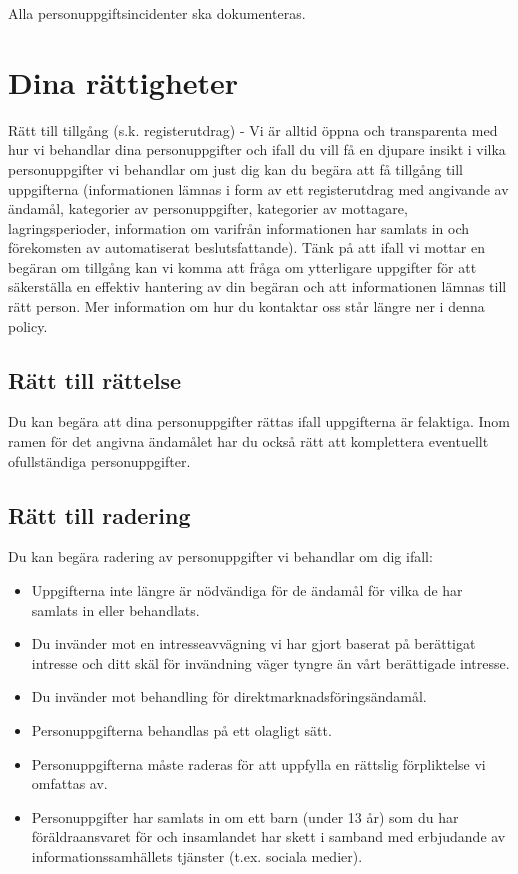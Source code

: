 \documentclass[a4paper]{article}
\begin{document}
Alla personuppgiftsincidenter ska dokumenteras.



\section{Dina rättigheter}
Rätt till tillgång
(s.k. registerutdrag) - Vi är alltid öppna och transparenta med hur vi behandlar dina
personuppgifter och ifall du vill få en djupare insikt i vilka personuppgifter vi behandlar
om just dig kan du begära att få tillgång till uppgifterna (informationen lämnas i form
av ett registerutdrag med angivande av ändamål, kategorier av personuppgifter,
kategorier av mottagare, lagringsperioder, information om varifrån informationen har
samlats in och förekomsten av automatiserat beslutsfattande).
Tänk på att ifall vi mottar en begäran om tillgång kan vi komma att fråga om ytterligare
uppgifter för att säkerställa en effektiv hantering av din begäran och att informationen
lämnas till rätt person.
Mer information om hur du kontaktar oss står längre ner i denna policy.

\subsection{Rätt till rättelse}
Du kan begära att dina personuppgifter rättas ifall uppgifterna är felaktiga. Inom
ramen för det angivna ändamålet har du också rätt att komplettera eventuellt
ofullständiga personuppgifter.

\subsection{Rätt till radering}
Du kan begära radering av personuppgifter vi behandlar om dig ifall:
\begin{itemize}
    \item Uppgifterna inte längre är nödvändiga för de ändamål för vilka de har samlats
    in eller behandlats.
    \item Du invänder mot en intresseavvägning vi har gjort baserat på berättigat intresse
    och ditt skäl för invändning väger tyngre än vårt berättigade intresse.
    \item Du invänder mot behandling för direktmarknadsföringsändamål.
    \item Personuppgifterna behandlas på ett olagligt sätt.
    \item Personuppgifterna måste raderas för att uppfylla en rättslig förpliktelse vi
    omfattas av.
    \item Personuppgifter har samlats in om ett barn (under 13 år) som du har
    föräldraansvaret för och insamlandet har skett i samband med erbjudande av
    informationssamhällets tjänster (t.ex. sociala medier).
\end{itemize}
\end{document}
